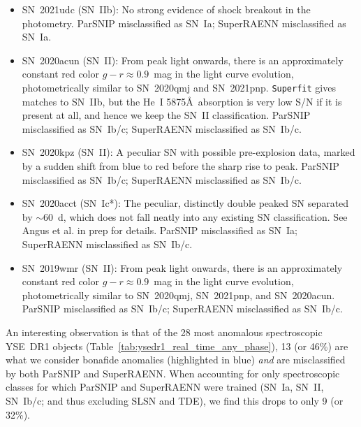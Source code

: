 \documentclass[twocolumn]{aastex63}
\begin{document}
\begin{itemize}
    \item SN~2021udc (SN~IIb): No strong evidence of shock breakout in the photometry. ParSNIP misclassified as SN~Ia; SuperRAENN misclassified as SN~Ia.
    \item SN~2020acun (SN~II): From peak light onwards, there is an approximately constant red color $g-r\approx0.9$~mag in the light curve evolution, photometrically similar to SN~2020qmj and SN~2021pnp. \texttt{Superfit} \citep{Howell2005} gives matches to SN~IIb, but the He~I 5875\AA~absorption is very low S/N if it is present at all, and hence we keep the SN~II classification. ParSNIP misclassified as SN~Ib/c; SuperRAENN misclassified as SN~Ib/c. 
    \item SN~2020kpz (SN~II): A peculiar SN with possible pre-explosion data, marked by a sudden shift from blue to red before the sharp rise to peak. ParSNIP misclassified as SN~Ib/c; SuperRAENN misclassified as SN~Ib/c. 
    \item SN~2020acct (SN~Ic*): The peculiar, distinctly double peaked SN separated by $\sim$60~d, which does not fall neatly into any existing SN classification. See Angus et al. in prep for details. ParSNIP misclassified as SN~Ia; SuperRAENN misclassified as SN~Ib/c.
    \item SN~2019wmr (SN~II): From peak light onwards, there is an approximately constant red color $g-r\approx0.9$~mag in the light curve evolution, photometrically similar to SN~2020qmj, SN~2021pnp, and SN~2020acun. ParSNIP misclassified as SN~Ib/c; SuperRAENN misclassified as SN~Ib/c. 
\end{itemize}

An interesting observation is that of the 28 most anomalous spectroscopic YSE~DR1 objects (Table~\ref{tab:ysedr1_real_time_any_phase}), 13 (or 46\%) are what we consider bonafide anomalies (highlighted in blue) \emph{and} are misclassified by both ParSNIP and SuperRAENN. When accounting for only spectroscopic classes for which ParSNIP and SuperRAENN were trained (SN~Ia, SN~II, SN~Ib/c; and thus excluding SLSN and TDE), we find this drops to only 9 (or 32\%). \par
\end{document}
